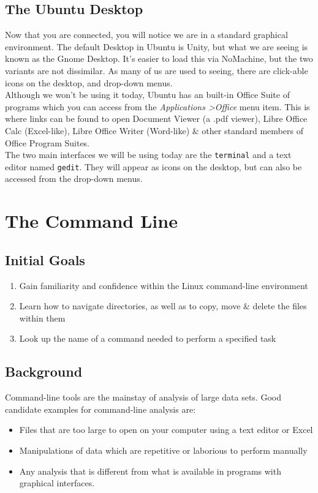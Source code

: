 \documentclass[a4paper,12pt,twoside]{memoir}
\begin{document}
\section{The Ubuntu Desktop}
\begin{note}
Now that you are connected, you will notice we are in a standard graphical environment.
The default Desktop in Ubuntu is Unity, but what we are seeing is known as the Gnome Desktop.
It's easier to load this via NoMachine, but the two variants are not dissimilar.
As many of us are used to seeing, there are click-able icons on the desktop, and drop-down menus. \\

Although we won't be using it today, Ubuntu has an built-in Office Suite of
programs which you can access from the \textit{Applications \textgreater Office} menu item.
This is where links can be found to open Document Viewer (a .pdf viewer), Libre Office Calc (Excel-like), Libre Office Writer (Word-like) \& other standard members of Office Program Suites. \\

The two main interfaces we will be using today are the \texttt{terminal} and a text editor named \texttt{gedit}.
They will appear as icons on the desktop, but can also be accessed from the drop-down menus.
\end{note}

\clearpage
\chapter{The Command Line}
\section{Initial Goals}
\begin{enumerate}
\item Gain familiarity and confidence within the Linux command-line environment
\item Learn how to navigate directories, as well as to copy, move \& delete the files within them
\item Look up the name of a command needed to perform a specified task
\end{enumerate}


\section{Background}
Command-line tools are the mainstay of analysis of large data sets.
Good candidate examples for command-line analysis are:
\begin{itemize}
\item Files that are too large to open on your computer using a text editor or Excel
\item Manipulations of data which are repetitive or laborious to perform manually
\item Any analysis that is different from what is available in programs with graphical interfaces.
\end{itemize}  
\end{document}
